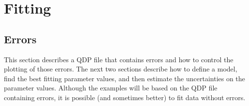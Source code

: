 \chapter{Fitting}

\section{Errors}

This section describes a QDP file that contains errors
and how to control the plotting of those errors.
The next two sections describe how to define a model,
find the best fitting parameter values,
and then estimate the uncertainties on the parameter values.
Although the examples will be based on the QDP file containing errors,
it is possible (and sometimes better) to fit data without errors.

